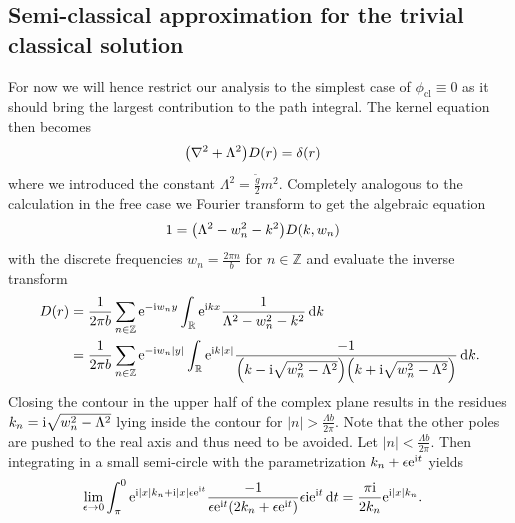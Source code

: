 \documentclass[english, parskip=full]{scrartcl}
\begin{document}
\subsection{Semi-classical approximation for the trivial classical solution}
For now we will hence restrict our analysis to the simplest case of $\phi_\text{cl}\equiv 0$ as it should bring the largest contribution to the path integral.
The kernel equation then becomes
\begin{align}
\kla*{\nabla^2 + \Lambda^2}D(r) &= \delta(r)
\end{align}
where we introduced the constant $\Lambda^2=\frac{\tilde{g}}{2} m^2$.
Completely analogous to the calculation in the free case we Fourier transform to get the algebraic equation
\begin{align}
1 &= \kla*{\Lambda^2 - w_n^2 - k^2}D(k,w_n)
\end{align}
with the discrete frequencies $w_n = \frac{2\pi n}{b}$ for $n\in\mathbb{Z}$ and evaluate the inverse transform
\begin{align}
D(r) &= \frac{1}{2\pi b} \sum_{n\in\mathbb{Z}} \powe{-\i w_ny} \intr{\powe{\i kx} \frac{1}{\Lambda^2 - w_n^2 - k^2}}{k}\\
&= \frac{1}{2\pi b} \sum_{n\in\mathbb{Z}} \powe{-\i w_n|y|} \intr{\powe{\i k|x|} \frac{-1}{\kla*{k - \i\sqrt{w_n^2 - \Lambda^2}} \kla*{k + \i\sqrt{w_n^2 - \Lambda^2}}}}{k}.
\end{align}
Closing the contour in the upper half of the complex plane results in the residues $k_n = \text{i}\sqrt{w_n^2 - \Lambda^2}$ lying inside the contour for $|n| > \frac{\Lambda b}{2\pi}$.
Note that the other poles are pushed to the real axis and thus need to be avoided.
Let $|n| < \frac{\Lambda b}{2\pi}$.
Then integrating in a small semi-circle with the parametrization $k_n + \epsilon \text{e}^{\text{i} t}$ yields
\begin{align}
\lim_{\epsilon\rightarrow 0}\intx{\pi}{0}{\powe{\i |x| k_n + \i |x| \epsilon \powe{\i t}} \frac{-1}{\epsilon \powe{\i t} \kla*{2k_n + \epsilon\powe{\i t}}} \epsilon\i \powe{\i t}}{t} &= \frac{\pi\i}{2k_n} \powe{\i |x|k_n}.
\end{align}
\end{document}
